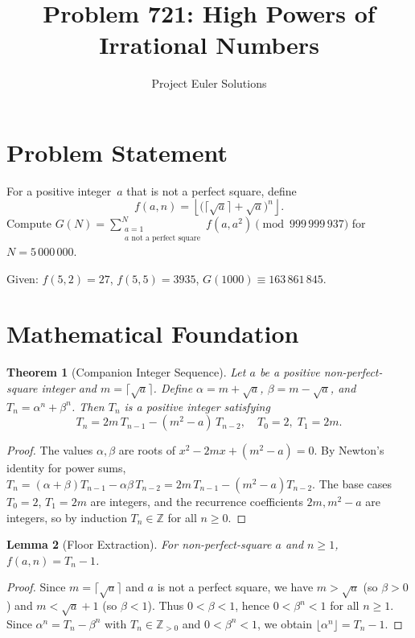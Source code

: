 \documentclass[11pt]{article}
\title{Problem 721: High Powers of Irrational Numbers}
\author{Project Euler Solutions}
\date{}
\newtheorem{theorem}{Theorem}
\newtheorem{lemma}[theorem]{Lemma}
\begin{document}
\maketitle

\section{Problem Statement}

For a positive integer~$a$ that is not a perfect square, define
\[
f(a, n) = \left\lfloor \bigl(\lceil\sqrt{a}\rceil + \sqrt{a}\bigr)^n \right\rfloor.
\]
Compute $G(N) = \sum_{\substack{a=1 \\ a \text{ not a perfect square}}}^{N} f(a, a^2) \pmod{999\,999\,937}$ for $N = 5\,000\,000$.

Given: $f(5,2)=27$, $f(5,5)=3935$, $G(1000) \equiv 163\,861\,845$.

\section{Mathematical Foundation}

\begin{theorem}[Companion Integer Sequence]
Let $a$ be a positive non-perfect-square integer and $m = \lceil\sqrt{a}\rceil$. Define $\alpha = m + \sqrt{a}$, $\beta = m - \sqrt{a}$, and $T_n = \alpha^n + \beta^n$. Then $T_n$ is a positive integer satisfying
\[
T_n = 2m\,T_{n-1} - (m^2 - a)\,T_{n-2}, \quad T_0 = 2,\; T_1 = 2m.
\]
\end{theorem}

\begin{proof}
The values $\alpha,\beta$ are roots of $x^2 - 2mx + (m^2-a) = 0$. By Newton's identity for power sums, $T_n = (\alpha+\beta)T_{n-1} - \alpha\beta\,T_{n-2} = 2m\,T_{n-1} - (m^2-a)T_{n-2}$. The base cases $T_0 = 2$, $T_1 = 2m$ are integers, and the recurrence coefficients $2m, m^2-a$ are integers, so by induction $T_n \in \mathbb{Z}$ for all $n \ge 0$.
\end{proof}

\begin{lemma}[Floor Extraction]
For non-perfect-square $a$ and $n \ge 1$, $f(a,n) = T_n - 1$.
\end{lemma}

\begin{proof}
Since $m = \lceil\sqrt{a}\rceil$ and $a$ is not a perfect square, we have $m > \sqrt{a}$ (so $\beta > 0$) and $m < \sqrt{a}+1$ (so $\beta < 1$). Thus $0 < \beta < 1$, hence $0 < \beta^n < 1$ for all $n \ge 1$. Since $\alpha^n = T_n - \beta^n$ with $T_n \in \mathbb{Z}_{>0}$ and $0 < \beta^n < 1$, we obtain $\lfloor \alpha^n \rfloor = T_n - 1$.
\end{proof}
\end{document}
